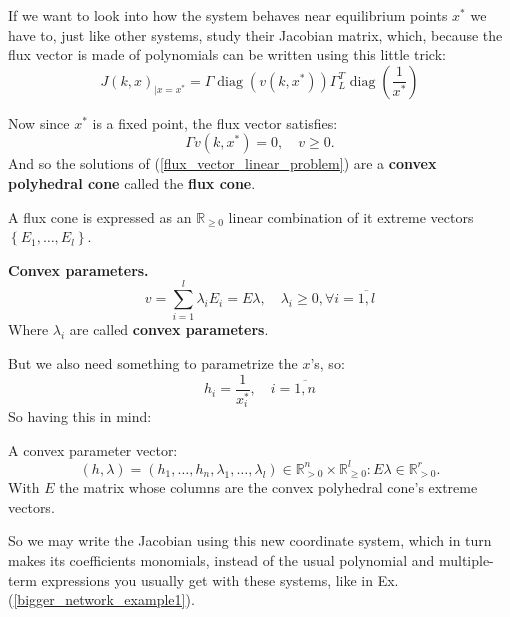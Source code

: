 If we want to look into how the system behaves near equilibrium points $x^*$ we have to, just like other systems, study their Jacobian matrix, which, because the flux vector is made of polynomials can be written using this little trick:
\[
	J(k, x)_{\mid x=x^*}=\Gamma \operatorname{diag}\left(v\left(k, x^*\right)\right) \Gamma_L^T \operatorname{diag}\left(\frac{1}{x^*}\right)
\]

Now since $x^*$ is a fixed point, the flux vector satisfies:
\begin{equation}\label{flux_vector_linear_problem}
	\Gamma v(k,x^*) = 0, \quad v \geq 0.
\end{equation}
And so the solutions of (\ref{flux_vector_linear_problem}) are a \textbf{convex polyhedral cone} called the \textbf{flux cone}.

A flux cone is expressed as an $\mathbb{R}_{\geq 0}$ linear combination of it extreme vectors $\left\{ E_1 , \ldots , E_l \right\}$.

\begin{definition}\label{convex_params_definition}
	\textbf{Convex parameters.}
	\begin{equation}\label{flux_cone}
		\boxed{		v=\sum_{i=1}^l \lambda_i E_i=E \lambda, \quad \lambda_i \geq 0, \forall i = \overline{1,l} }
	\end{equation}
	Where $\lambda_i$ are called \textbf{convex parameters}.
\end{definition}
But we also need something to parametrize the $x$'s, so:
\begin{equation}\label{other_convex_parameters}
	\boxed{	h_i=\frac{1}{x_i^*}, \quad i = \overline{1,n} }
\end{equation}
So having this in mind:
\begin{definition}
	A convex parameter vector:
	\[
		(h, \lambda) = (h_1, \ldots, h_n , \lambda_1, \ldots , \lambda_l) \in \mathbb{R}_{>0}^n \times \mathbb{R}_{\geq 0}^{l} : E \lambda \in \mathbb{R}^r_{> 0}.
	\]
	With $E$ the matrix whose columns are the convex polyhedral cone's extreme vectors.
\end{definition}
So we may write the Jacobian using this new coordinate system, which in turn makes its coefficients monomials, instead of the usual polynomial and multiple-term expressions you usually get with these systems, like in Ex. (\ref{bigger_network_example1}).
\newcommand\eqCuzConvex{\stackrel{\mathclap{\normalfont\mbox{\ref{flux_vector_linear_problem}, \ref{convex_params_definition}}}}{=\joinrel=\joinrel=\joinrel=\joinrel=}}

